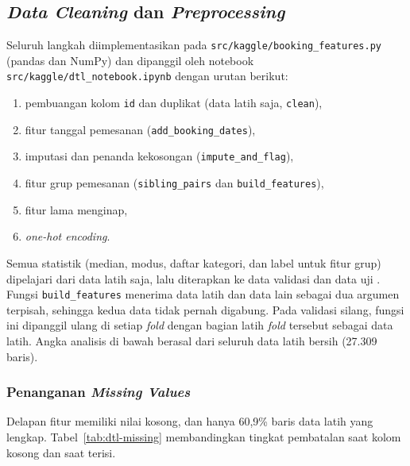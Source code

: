 \subsection{\textit{Data Cleaning} dan \textit{Preprocessing}}
\label{subsec:dtl-preprocessing}

Seluruh langkah diimplementasikan pada \nolinkurl{src/kaggle/booking_features.py} (pandas dan NumPy)
dan dipanggil oleh notebook \nolinkurl{src/kaggle/dtl_notebook.ipynb} dengan urutan berikut:
\begin{enumerate}
	\item pembuangan kolom \texttt{id} dan duplikat (data latih saja, \texttt{clean}),
	\item fitur tanggal pemesanan (\texttt{add\_booking\_dates}),
	\item imputasi dan penanda kekosongan (\texttt{impute\_and\_flag}),
	\item fitur grup pemesanan (\texttt{sibling\_pairs} dan \texttt{build\_features}),
	\item fitur lama menginap,
	\item \textit{one-hot encoding}.
\end{enumerate}
Semua statistik (median, modus, daftar kategori, dan label untuk fitur grup) dipelajari dari data
latih saja, lalu diterapkan ke data validasi dan data uji \cite{slide-dataprep}. Fungsi
\texttt{build\_features} menerima data latih dan data lain sebagai dua argumen terpisah, sehingga
kedua data tidak pernah digabung. Pada validasi silang, fungsi ini dipanggil ulang di setiap
\textit{fold} dengan bagian latih \textit{fold} tersebut sebagai data latih. Angka analisis di bawah
berasal dari seluruh data latih bersih (27.309 baris).

\subsubsection{Penanganan \textit{Missing Values}}

Delapan fitur memiliki nilai kosong, dan hanya 60,9\% baris data latih yang lengkap.
Tabel~\ref{tab:dtl-missing} membandingkan tingkat pembatalan saat kolom kosong dan saat terisi.

